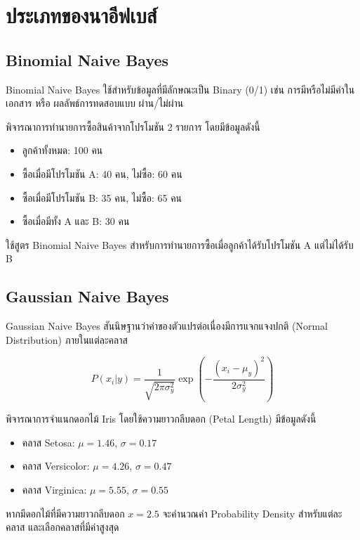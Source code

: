 \section{ประเภทของนาอีฟเบส์}

\subsection{Binomial Naive Bayes}
Binomial Naive Bayes ใช้สำหรับข้อมูลที่มีลักษณะเป็น Binary (0/1) เช่น การมีหรือไม่มีคำในเอกสาร หรือ ผลลัพธ์การทดสอบแบบ ผ่าน/ไม่ผ่าน

\begin{exmp}
\label{exmp:binomial_naive_bayes}
พิจารณาการทำนายการซื้อสินค้าจากโปรโมชัน 2 รายการ โดยมีข้อมูลดังนี้

\begin{itemize}
\item ลูกค้าทั้งหมด: 100 คน
\item ซื้อเมื่อมีโปรโมชัน A: 40 คน, ไม่ซื้อ: 60 คน
\item ซื้อเมื่อมีโปรโมชัน B: 35 คน, ไม่ซื้อ: 65 คน
\item ซื้อเมื่อมีทั้ง A และ B: 30 คน
\end{itemize}

ใช้สูตร Binomial Naive Bayes สำหรับการทำนายการซื้อเมื่อลูกค้าได้รับโปรโมชัน A แต่ไม่ได้รับ B
\end{exmp}

\subsection{Gaussian Naive Bayes}
Gaussian Naive Bayes สันนิษฐานว่าค่าของตัวแปรต่อเนื่องมีการแจกแจงปกติ (Normal Distribution) ภายในแต่ละคลาส

\[
P(x_i | y) = \frac{1}{\sqrt{2\pi\sigma_y^2}} \exp\left(-\frac{(x_i - \mu_y)^2}{2\sigma_y^2}\right)
\]

\begin{exmp}
\label{exmp:gaussian_naive_bayes}
พิจารณาการจำแนกดอกไม้ Iris โดยใช้ความยาวกลีบดอก (Petal Length) มีข้อมูลดังนี้

\begin{itemize}
\item คลาส Setosa: $\mu = 1.46$, $\sigma = 0.17$
\item คลาส Versicolor: $\mu = 4.26$, $\sigma = 0.47$
\item คลาส Virginica: $\mu = 5.55$, $\sigma = 0.55$
\end{itemize}

หากมีดอกไม้ที่มีความยาวกลีบดอก $x = 2.5$ จะคำนวณค่า Probability Density สำหรับแต่ละคลาส และเลือกคลาสที่มีค่าสูงสุด
\end{exmp}

